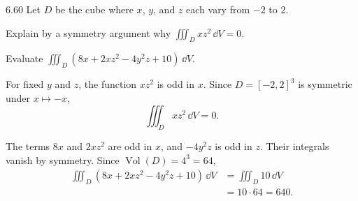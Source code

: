 \documentclass[11pt,oneside]{article}
\begin{document}
\begin{problem}{6.60}
Let $D$ be the cube where $x$, $y$, and $z$ each vary from $-2$ to $2$.
\begin{problemsubparts}
    \item Explain by a symmetry argument why
          $\displaystyle\iiint_D xz^2\,\dd V=0$.
    \item Evaluate
          $\displaystyle\iiint_D(8x+2xz^2-4y^2z+10)\,\dd V$.
\end{problemsubparts}
\end{problem}
\begin{solution}
\begin{problemsubparts}
    \item For fixed $y$ and $z$, the function $xz^2$ is odd in $x$.
    Since $D=[-2, 2]^3$ is symmetric under $x\mapsto-x$,
    \[
        \iiint_D xz^2\,\dd V=\boxed{0}.
    \]
    \item The terms $8x$ and $2xz^2$ are odd in $x$, and
    $-4y^2z$ is odd in $z$. Their integrals vanish by symmetry.
    Since $\operatorname{Vol}(D)=4^3=64$,
    \[
    \begin{aligned}
        \iiint_D(8x+2xz^2-4y^2z+10)\,\dd V
        &=\iiint_D10\,\dd V\\
        &=10\cdot64=\boxed{640}.
    \end{aligned}
    \]
\end{problemsubparts}
\end{solution}
\end{document}
